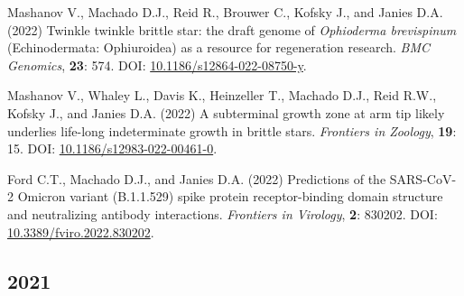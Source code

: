 \documentclass[11pt, letterpaper, sans]{moderncv}
\begin{document}
    {\setlength{\parskip}{.5em}\renewcommand{\baselinestretch}{2.0}\begin{hangparas}{.25in}{1}

		Mashanov V., Machado D.J., Reid R., Brouwer C., Kofsky J., and Janies D.A. (2022) Twinkle twinkle brittle star: the draft genome of \textit{Ophioderma brevispinum} (Echinodermata: Ophiuroidea) as a resource for regeneration research. \textit{BMC Genomics}, \textbf{23}: 574. DOI: \href{https://doi.org/10.1186/s12864-022-08750-y}{10.1186/s12864-022-08750-y}.

    	Mashanov V., Whaley L., Davis K., Heinzeller T., Machado D.J., Reid R.W., Kofsky J., and Janies D.A. (2022) A subterminal growth zone at arm tip likely underlies life-long indeterminate growth in brittle stars. \textit{Frontiers in Zoology}, \textbf{19}: 15. DOI: \href{https://doi.org/10.1186/s12983-022-00461-0}{10.1186/s12983-022-00461-0}.

    	Ford C.T., Machado D.J., and Janies D.A. (2022) Predictions of the SARS-CoV-2 Omicron variant (B.1.1.529) spike protein receptor-binding domain structure and neutralizing antibody interactions. \textit{Frontiers in Virology}, \textbf{2}: 830202. DOI: \href{https://doi.org/10.3389/fviro.2022.830202}{10.3389/fviro.2022.830202}.

    \end{hangparas}}


\subsection{2021}
\end{document}

